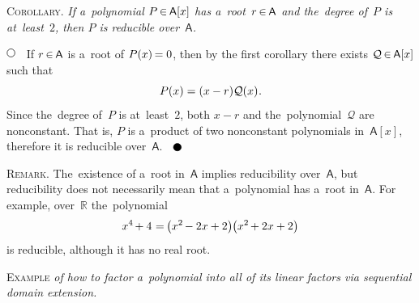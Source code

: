 \documentclass[11pt, twoside]{book}
\newcommand\oex{\hspace{1ex}} %
\newcommand\nfex{\hspace{-0.2ex}} %
\newcommand\thex{\hspace{.1ex}} %
\newcommand\nthex{\hspace{-0.1ex}} %
\newcommand\domain{\mathsf{A}}
\newcommand\cin{\nfex\in\nfex}
\newcommand\theproofbegins{\ensuremath{\tikz[baseline=-1ex] \draw [line width=.5pt, color=black, fill=white] (0, 0) circle (.8ex); \hspace{.6em}}}
\newcommand\theproofends{\ensuremath{\hspace{.6em} \tikz[baseline=-0.6ex] \draw [color=black, fill=black] (0, 0) circle (.8ex);}}
\begin{document}
\vspace{.5em}

%
%

\noindent
\textsc{Corollary}.
{\itshape
If a~polynomial ${P \cin \domain[x]}$ has a~root~${r \cin \domain}$ and the~degree of~$P$ is at~least~$2$,
then ${P}$ is reducible over~$\domain$.
}

\nopagebreak
\noindent
\theproofbegins\oex
If ${r \cin \domain}$ is a~root of ${P(x) \nfex = 0}$,
then by the first corollary there exists ${\mathcal{Q} \cin \domain[x]}$
such that
%
\begin{equation*}
P(x) = (x-r)\mathcal{Q}(x)
\hspace{.1ex} .
\end{equation*}
%
Since the~degree of~$P$ is at~least~$2$, both ${x-r}$ and the~polynomial~${\mathcal{Q}}$ are nonconstant.
That is, ${P}$ is a~product of two nonconstant polynomials in~$\domain[x]$,
therefore it is reducible over~$\domain$.
\hspace*{\fill}
\theproofends

\vspace{.5em}

%
%

\noindent
\textsc{Remark}.
The~existence of a~root in~$\domain$ implies reducibility over~$\domain$,
but reducibility does not necessarily mean that a~polynomial has a~root in~$\domain$.
For example, over~$\mathbb{R}$ the~polynomial
%
\vspace{-0.25em}
\begin{equation*}
x^4 \nfex + 4
\thex = \nfex
\bigl(x^2 \nfex - 2x + 2\bigr) \nthex \bigl(x^2 \nfex + 2x + 2\bigr)
\vspace{-0.25em}
\end{equation*}
%
is reducible, although it has no real root.

%
%

\vspace{.5em}

\noindent
\textsc{Example}
{\itshape
of how to factor a~polynomial into all of its linear factors via sequential domain extension.
}

\noindent
{}
\end{document}
